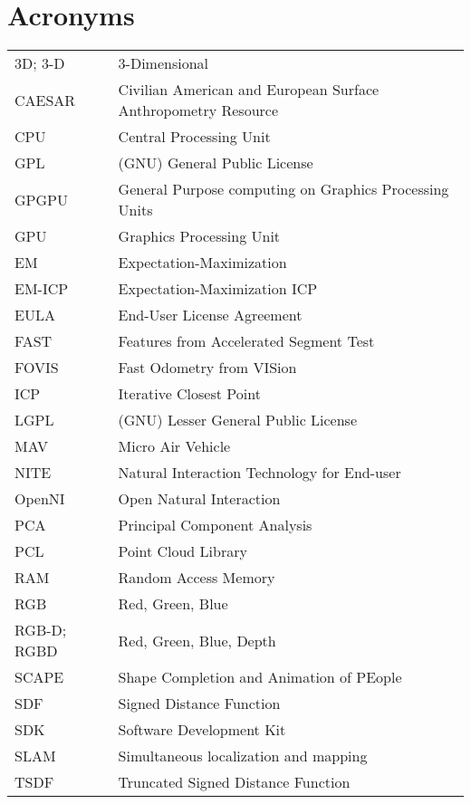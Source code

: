 \chapter*{Acronyms}


\noindent
\begin{longtable}{@{}p{}p{}@{}}
    3D; 3-D & 3-Dimensional \\
     CAESAR & Civilian American and European Surface Anthropometry Resource \\
        CPU & Central Processing Unit \\
        GPL & (GNU) General Public License \\
      GPGPU & General Purpose computing on Graphics Processing Units \\
        GPU & Graphics Processing Unit \\
         EM & Expectation-Maximization \\
     EM-ICP & Expectation-Maximization ICP \\
       EULA & End-User License Agreement \\
       FAST & Features from Accelerated Segment Test \\
      FOVIS & Fast Odometry from VISion \\
        ICP & Iterative Closest Point \\
       LGPL & (GNU) Lesser General Public License \\
        MAV & Micro Air Vehicle \\
       NITE & Natural Interaction Technology for End-user \\
     OpenNI & Open Natural Interaction \\
        PCA & Principal Component Analysis \\
        PCL & Point Cloud Library \\
        RAM & Random Access Memory \\
        RGB & Red, Green, Blue \\
RGB-D; RGBD & Red, Green, Blue, Depth \\
      SCAPE & Shape Completion and Animation of PEople \\
        SDF & Signed Distance Function \\
        SDK & Software Development Kit \\
       SLAM & Simultaneous localization and mapping \\
       TSDF & Truncated Signed Distance Function \\
\end{longtable}


